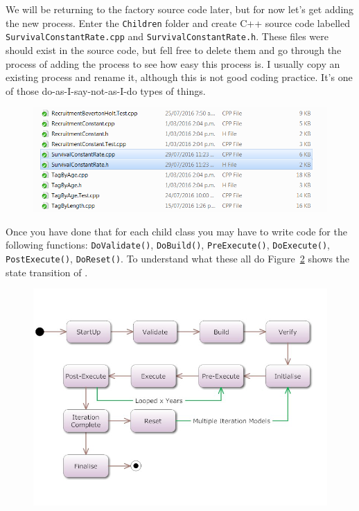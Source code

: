 We will be returning to the factory source code later, but for now let's get adding the new process. Enter the \texttt{Children} folder and create C++ source code labelled \texttt{SurvivalConstantRate.cpp} and \texttt{SurvivalConstantRate.h}. These files were should exist in the source code, but fell free to delete them and go through the process of adding the process to see how easy this process is. I usually copy an existing process and rename it, although this is not good coding practice. It's one of those do-as-I-say-not-as-I-do types of things.
\begin{figure}[!ht]
	\centering
	\includegraphics[scale=0.6]{Figures/add_survival.png}
	\caption{}\label{fig:process2}
\end{figure}

Once you have done that for each child class you may have to write code for the following functions{\color{red}:} \texttt{DoValidate()}, \texttt{DoBuild()}, \texttt{PreExecute()}, \texttt{DoExecute()}, \texttt{PostExecute()}, \texttt{DoReset()}. To understand what these all do Figure~\ref{fig:flow} shows the state transition of \CNAME.
\raggedbottom
\begin{figure}[!ht]
	\centering
	\includegraphics[scale=0.6]{Figures/State-Transition.png}
	\caption{}\label{fig:flow}
\end{figure}

